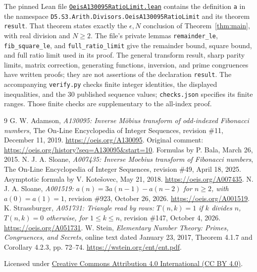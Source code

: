 \documentclass[11pt]{article}
\begin{document}
The pinned Lean file
\href{https://github.com/the-omega-institute/trureturing/blob/d51b6958b717911d2705676a6e9bf473b3b6f324/D5/S3/Arith/Divisors/OeisA130095RatioLimit.lean}{\texttt{OeisA130095RatioLimit.lean}}
contains the definition \texttt{a} in the namespace
\texttt{D5.S3.Arith.Divisors.OeisA130095RatioLimit} and its theorem
\texttt{result}. That theorem states exactly the $\epsilon,N$
conclusion of Theorem~\ref{thm:main}, with real division and $N\geq2$.
The file's private lemmas \texttt{remainder\_le},
\texttt{fib\_square\_le}, and \texttt{full\_ratio\_limit} give the
remainder bound, square bound, and full ratio limit used in its proof.
The general transform result, sharp parity limits, matrix correction,
generating functions, inversion, and prime congruences have written
proofs; they are not assertions of the declaration \texttt{result}.
The accompanying \texttt{verify.py} checks finite integer identities,
the displayed inequalities, and the 30 published sequence values;
\texttt{checks.json} specifies its finite ranges. Those finite checks
are supplementary to the all-index proof.

\begin{thebibliography}{9}
 G. W. Adamson,
\emph{A130095: Inverse M\"obius transform of odd-indexed Fibonacci numbers},
The On-Line Encyclopedia of Integer Sequences, revision \#11,
December 11, 2019.
\url{https://oeis.org/A130095}.
Original comment: \url{https://oeis.org/history?seq=A130095&start=10}.
Formulas by P. Bala, March 26, 2015.
 N. J. A. Sloane,
\emph{A007435: Inverse Moebius transform of Fibonacci numbers},
The On-Line Encyclopedia of Integer Sequences, revision \#49,
April 18, 2025.
Asymptotic formula by V. Kote\v{s}ovec, May 21, 2018.
\url{https://oeis.org/A007435}.
 N. J. A. Sloane,
\emph{A001519: $a(n)=3a(n-1)-a(n-2)$ for $n\geq2$, with
$a(0)=a(1)=1$}, revision \#923,
October 26, 2026. \url{https://oeis.org/A001519}.
 K. Strassburger,
\emph{A051731: Triangle read by rows: $T(n,k)=1$ if $k$ divides $n$,
$T(n,k)=0$ otherwise, for $1\leq k\leq n$}, revision \#147,
October 4, 2026. \url{https://oeis.org/A051731}.
 W. Stein,
\emph{Elementary Number Theory: Primes, Congruences, and Secrets},
online text dated January 23, 2017, Theorem 4.1.7 and Corollary 4.2.3,
pp. 72--74. \url{https://wstein.org/ent/ent.pdf}.
\end{thebibliography}
\noindent\small Licensed under
\href{https://creativecommons.org/licenses/by/4.0/}{Creative Commons
Attribution 4.0 International (CC BY 4.0)}.
\end{document}

